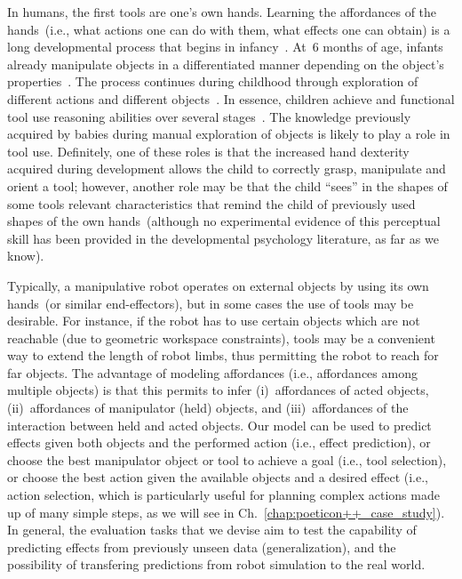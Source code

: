 In humans, the first tools are one's own hands.
Learning the affordances of the hands~(i.e., what actions one can do with them, what effects one can obtain) is a long developmental process that begins in infancy~\cite{egibson:1994,james:2010:icd}.
At~6 months of age, infants already manipulate objects in a differentiated manner depending on the object's properties~\cite{bushnell:1993:child}.
The process continues during childhood through exploration of different actions and different objects~\cite{rosenblatt:1977:bioplay,rosenbaum:2009}.
In essence, children achieve \intobj{} and functional tool use reasoning abilities over several stages~\cite{lockman:2000:childdev,szokolszky:2010,lobo:2013:ibd,fagard:2014:emergence}.
The knowledge previously acquired by babies during manual exploration of objects is likely to play a role in tool use.
Definitely, one of these roles is that the increased hand dexterity acquired during development allows the child to correctly grasp, manipulate and orient a tool; however, another role may be that the child ``sees'' in the shapes of some tools relevant characteristics that remind the child of previously used shapes of the own hands~(although no experimental evidence of this perceptual skill has been provided in the developmental psychology literature, as far as we know).

Typically, a manipulative robot operates on external objects by using its own hands~(or similar end-effectors), but in some cases the use of tools may be desirable.
For instance, if the robot has to use certain objects which are not reachable (due to geometric workspace constraints), tools may be a convenient way to extend the length of robot limbs, thus permitting the robot to reach for far objects.
The advantage of modeling \intobj{} affordances (i.e., affordances among multiple objects) is that this permits to infer
(i)~affordances of acted objects,
(ii)~affordances of manipulator (held) objects, and
(iii)~affordances of the interaction between held and acted objects.
Our model can be used
to predict effects given both objects and the performed action (i.e., effect prediction), or choose the best manipulator object or tool to achieve a goal (i.e., tool selection), or choose the best action given the available objects and a desired effect (i.e., action selection, which is particularly useful for planning complex actions made up of many simple steps, as we will see in Ch.~\ref{chap:poeticon++_case_study}).
In general, the evaluation tasks that we devise aim to test
the capability of predicting effects from previously unseen data (generalization), and the possibility of transfering predictions from robot simulation to the real world.

